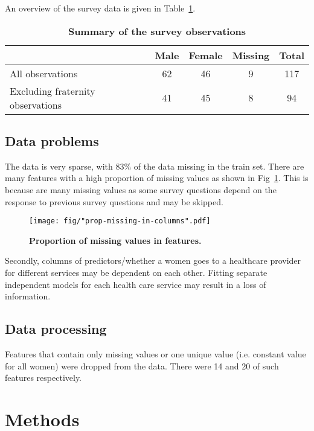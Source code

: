 \documentclass{article}\usepackage[]{graphicx}\usepackage[]{color}
\begin{document}
An overview of the survey data is given in Table~\ref{tab-data}.

\begin{table}[ht]
  \centering
  \begin{tabular}{@{}|l|c|c|c|c|@{}}
  	\hline
		& Male & Female & Missing & Total\\ 
		\hline
		All observations & 62 & 46 & 9 & 117 \\ 
			Excluding fraternity observations & 41 & 45 & 8 & 94\\ 
		\hline
	\end{tabular}
	\caption{\textbf{Summary of the survey observations}} 
  \label{tab-data}
\end{table}

\subsection{Data problems}
The data is very sparse, with 83\% of the data missing in the train set. There are many features with a high proportion of missing values as shown in Fig~\ref{fig-missing}. This is because are many missing values as some survey questions depend on the response to previous survey questions and may be skipped.

\begin{figure}[htbp]
    \begin{center}
		\texttt{[image: fig/"prop-missing-in-columns".pdf]}
		\caption{\textbf{Proportion of missing values in features.}}
		\label{fig-missing}
  \end{center}
\end{figure}

Secondly, columns of predictors/whether a women goes to a healthcare provider for different services may be dependent on each other. Fitting separate independent models for each health care service may result in a loss of information.

\subsection{Data processing}
Features that contain only missing values or one unique value (i.e. constant value for all women) were dropped from the data. There were 14 and 20 of such features respectively.
\section{Methods}
\label{sec:methods}
\end{document}
